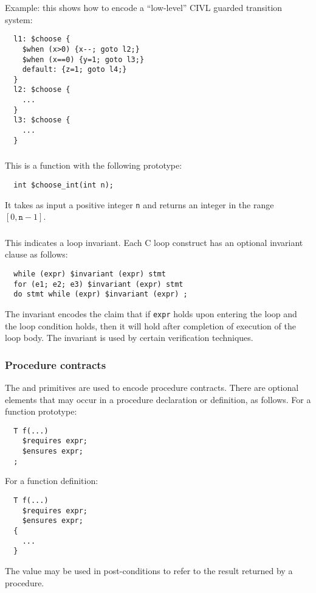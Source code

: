 \documentclass[11pt]{article}
\begin{document}
Example: this shows how to encode a ``low-level'' CIVL guarded
transition system:

\begin{verbatim}
  l1: $choose {
    $when (x>0) {x--; goto l2;}
    $when (x==0) {y=1; goto l3;}
    default: {z=1; goto l4;}
  }
  l2: $choose {
    ...
  }
  l3: $choose {
    ...
  }
\end{verbatim}

\subsubsection{\cchooseint} This is a function with the following prototype:
\begin{verbatim}
  int $choose_int(int n);
\end{verbatim}
It takes as input a positive integer \texttt{n} and returns an integer
in the range $[0,\texttt{n}-1]$.  

\subsubsection{\cinvariant} This indicates a loop invariant.  Each C loop construct has an
optional invariant clause as follows:
\begin{verbatim}
  while (expr) $invariant (expr) stmt
  for (e1; e2; e3) $invariant (expr) stmt
  do stmt while (expr) $invariant (expr) ;
\end{verbatim}
The invariant encodes the claim that if \texttt{expr} holds upon
entering the loop and the loop condition holds, then it will hold
after completion of execution of the loop body.  The invariant is used
by certain verification techniques.

\subsubsection{Procedure contracts}
The \crequires{} and \censures{} primitives are used to encode
procedure contracts.  There are optional
elements that may occur in a procedure declaration or definition,
as follows.  For a function prototype:
\begin{verbatim}
  T f(...)
    $requires expr;
    $ensures expr;
  ;
\end{verbatim}
For a function definition:
\begin{verbatim}
  T f(...)
    $requires expr;
    $ensures expr;
  {
    ...
  }
\end{verbatim}
The value \cresult{} may be used in post-conditions to refer
to the result returned by a procedure.
\end{document}
